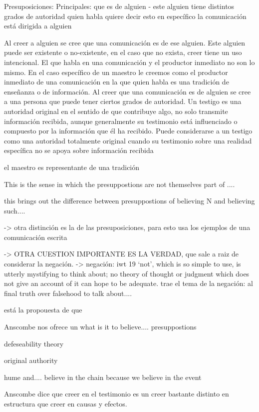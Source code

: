 Presuposiciones:
Principales:
que es de alguien
- este alguien tiene distintos grados de autoridad
quien habla quiere decir esto en específico
la comunicación está dirigida a alguien

Al creer a alguien se cree que una comunicación es de ese alguien. Este alguien puede ser existente o no-existente, en el caso que no exista, creer tiene un uso intencional.
El que habla en una comunicación y el productor inmediato no son lo mismo.
En el caso específico de un maestro le creemos como el productor inmediato de una comunicación en la que quien habla es una tradición de enseñanza o de información.
Al creer que una comunicación es de alguien se cree a una persona que puede tener ciertos grados de autoridad.
Un testigo es una autoridad original en el sentido de que contribuye algo, no solo transmite información recibida, aunque generalmente su testimonio está influenciado o compuesto por la información que él ha recibido.
Puede considerarse a un testigo como una autoridad totalmente original cuando su testimonio sobre una realidad específica no se apoya sobre información recibida

el maestro es representante de una tradición

 This is the sense in which the presuppostions are not themselves part of ....

this brings out the difference between presuppostions of believing N and believing such....



-> otra distinción es la de las presuposiciones, para esto usa los ejemplos de una comunicación escrita

-> OTRA CUESTION IMPORTANTE ES LA VERDAD, que sale a raiz de considerar la negación.
-> negación: iwt 19 `not', which is so simple to use, is utterly mystifying to think about; no theory of thought or judgment which does not give an account of it can hope to be adequate.
trae el tema de la negación: al final truth over falsehood to talk about....

está la propouesta de que

Anscombe nos ofrece un
what is it to believe.... presuppostions

defeseability theory

original authority

hume and.... believe in the chain because we believe in the event

Anscombe dice que creer en el testimonio es un creer bastante distinto en estructura
que creer en causas y efectos.

